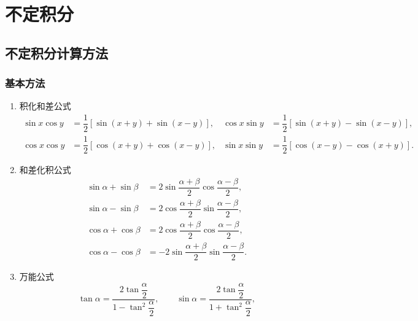 \setcounter{chapter}{4}
\pagestyle{fancy}

\chapter{不定积分}


\section{不定积分计算方法}


\subsection{基本方法}

\begin{theorem}
    \begin{enumerate}[label=\arabic*.]
        \item 积化和差公式
              \begin{align*}
                  \sin x\cos y & =\dfrac{1}{2}[\sin(x+y)+\sin(x-y)],
                               & \cos x\sin y                        & =\dfrac{1}{2}[\sin(x+y)-\sin(x-y)], \\
                  \cos x\cos y & =\dfrac{1}{2}[\cos(x+y)+\cos(x-y)],
                               & \sin x\sin y                        & =\dfrac{1}{2}[\cos(x-y)-\cos(x+y)].
              \end{align*}
        \item 和差化积公式
              \begin{align*}
                  \sin\alpha+\sin\beta
                   & =2\sin\dfrac{\alpha+\beta}{2}\cos\dfrac{\alpha-\beta}{2},  \\
                  \sin\alpha-\sin\beta
                   & =2\cos\dfrac{\alpha+\beta}{2}\sin\dfrac{\alpha-\beta}{2},  \\
                  \cos\alpha+\cos\beta
                   & =2\cos\dfrac{\alpha+\beta}{2}\cos\dfrac{\alpha-\beta}{2},  \\
                  \cos\alpha-\cos\beta
                   & =-2\sin\dfrac{\alpha+\beta}{2}\sin\dfrac{\alpha-\beta}{2}.
              \end{align*}
        \item 万能公式
              \[
                  \tan\alpha=\dfrac{2\tan\dfrac{\alpha}{2}}{1-\tan^2\dfrac{\alpha}{2}},
                  \qquad
                  \sin\alpha=\dfrac{2\tan\dfrac{\alpha}{2}}{1+\tan^2\dfrac{\alpha}{2}},
\]
\end{enumerate}
\end{theorem}
